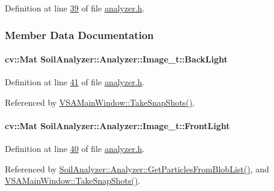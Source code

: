 Definition at line \hyperlink{analyzer_8h_source_l00039}{39} of file \hyperlink{analyzer_8h_source}{analyzer.\+h}.



\subsubsection{Member Data Documentation}
\hypertarget{struct_soil_analyzer_1_1_analyzer_1_1_image__t_a504fc04b0d64945e742c9ac7a48f2598}{}
\paragraph[{Back\+Light}]{\setlength{\rightskip}{0pt plus 5cm}cv\+::\+Mat Soil\+Analyzer\+::\+Analyzer\+::\+Image\+\_\+t\+::\+Back\+Light}\label{struct_soil_analyzer_1_1_analyzer_1_1_image__t_a504fc04b0d64945e742c9ac7a48f2598}


Definition at line \hyperlink{analyzer_8h_source_l00041}{41} of file \hyperlink{analyzer_8h_source}{analyzer.\+h}.



Referenced by \hyperlink{vsamainwindow_8cpp_source_l00391}{V\+S\+A\+Main\+Window\+::\+Take\+Snap\+Shots()}.

\hypertarget{struct_soil_analyzer_1_1_analyzer_1_1_image__t_aea2974c543b090703237f17d0c192699}{}
\paragraph[{Front\+Light}]{\setlength{\rightskip}{0pt plus 5cm}cv\+::\+Mat Soil\+Analyzer\+::\+Analyzer\+::\+Image\+\_\+t\+::\+Front\+Light}\label{struct_soil_analyzer_1_1_analyzer_1_1_image__t_aea2974c543b090703237f17d0c192699}


Definition at line \hyperlink{analyzer_8h_source_l00040}{40} of file \hyperlink{analyzer_8h_source}{analyzer.\+h}.



Referenced by \hyperlink{analyzer_8cpp_source_l00322}{Soil\+Analyzer\+::\+Analyzer\+::\+Get\+Particles\+From\+Blob\+List()}, and \hyperlink{vsamainwindow_8cpp_source_l00391}{V\+S\+A\+Main\+Window\+::\+Take\+Snap\+Shots()}.

